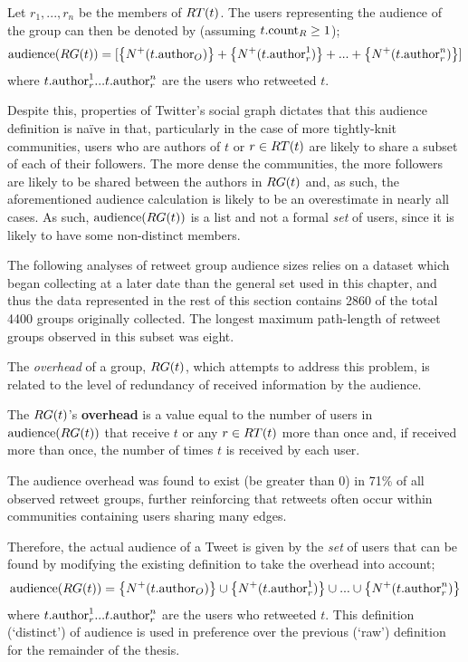 Let $ r_1,...,r_n $ be the members of $RT(t)$. The users representing the audience of the group can then be denoted by (assuming $t.\textrm{count}_R \geq 1$);
\[
	\textrm{audience}(RG(t)) = [\left\{N^+(t.\textrm{author}_O)\right\} + \left\{N^+(t.\textrm{author}_r^1)\right\} + ... + \left\{N^+(t.\textrm{author}_r^n)\right\}] 
\]
where $t.\textrm{author}_r^1 ... t.\textrm{author}_r^n$ are the users who retweeted $t$.

Despite this, properties of Twitter's social graph dictates that this audience definition is na{\"i}ve in that, particularly in the case of more tightly-knit communities, users who are authors of $t$ or $r \in RT(t)$ are likely to share a subset of each of their followers. The more dense the communities, the more followers are likely to be shared between the authors in $RG(t)$ and, as such, the aforementioned audience calculation is likely to be an overestimate in nearly all cases. As such, $\textrm{audience}(RG(t))$ is a list and not a formal \textit{set} of users, since it is likely to have some non-distinct members.

The following analyses of retweet group audience sizes relies on a dataset which began collecting at a later date than the general set used in this chapter, and thus the data represented in the rest of this section contains 2860 of the total 4400 groups originally collected. The longest maximum path-length of retweet groups observed in this subset was eight.

The \textit{overhead} of a group, $RG(t)$, which attempts to address this problem, is related to the level of redundancy of received information by the audience.

\begin{mydefinition}
    The $RG(t)$'s \textbf{overhead} is a value equal to the number of users in $\textrm{audience}(RG(t))$ that receive $t$ or any $r \in RT(t)$ more than once and, if received more than once, the number of times $t$ is received by each user.
\end{mydefinition}

The audience overhead was found to exist (be greater than 0) in 71\% of all observed retweet groups, further reinforcing that retweets often occur within communities containing users sharing many edges.

Therefore, the actual audience of a Tweet is given by the \textit{set} of users that can be found by modifying the existing definition to take the overhead into account;
\[
	\textrm{audience}(RG(t)) = \left\{N^+(t.\textrm{author}_O)\right\} \cup \left\{N^+(t.\textrm{author}_r^1)\right\} \cup ... \cup \left\{N^+(t.\textrm{author}_r^n)\right\}
\]
where $t.\textrm{author}_r^1 ... t.\textrm{author}_r^n$ are the users who retweeted $t$. This definition (`distinct') of audience is used in preference over the previous (`raw') definition for the remainder of the thesis.

